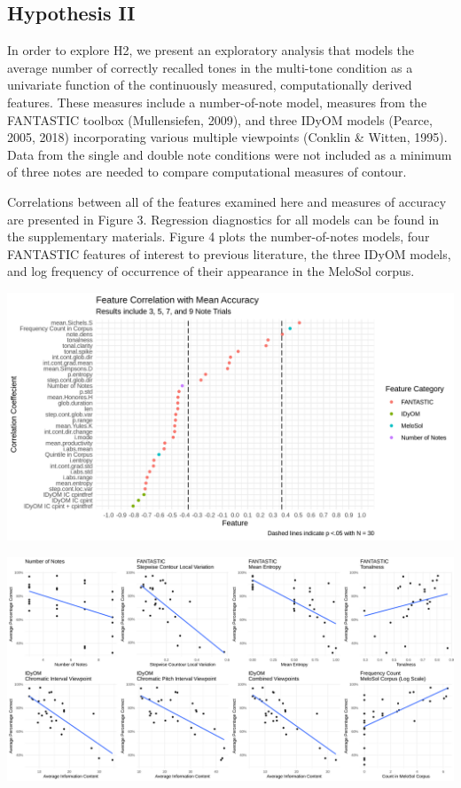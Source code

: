 \documentclass[english,man,floatsintext]{apa6}
\begin{document}
\hypertarget{hypothesis-ii}{%
\subsection{Hypothesis II}\label{hypothesis-ii}}

In order to explore H2, we present an exploratory analysis that models the average number of correctly recalled tones in the multi-tone condition as a univariate function of the continuously measured, computationally derived features.
These measures include a number-of-note model, measures from the FANTASTIC toolbox (Mullensiefen, 2009), and three IDyOM models (Pearce, 2005, 2018) incorporating various multiple viewpoints (Conklin \& Witten, 1995).
Data from the single and double note conditions were not included as a minimum of three notes are needed to compare computational measures of contour.

Correlations between all of the features examined here and measures of accuracy are presented in Figure 3.
Regression diagnostics for all models can be found in the supplementary materials.
Figure 4 plots the number-of-notes models, four FANTASTIC features of interest to previous literature, the three IDyOM models, and log frequency of occurrence of their appearance in the MeloSol corpus.

\includegraphics{../figures/cor_plot_fig_h2.png}

\includegraphics{../figures/cowplot.png}
\end{document}
